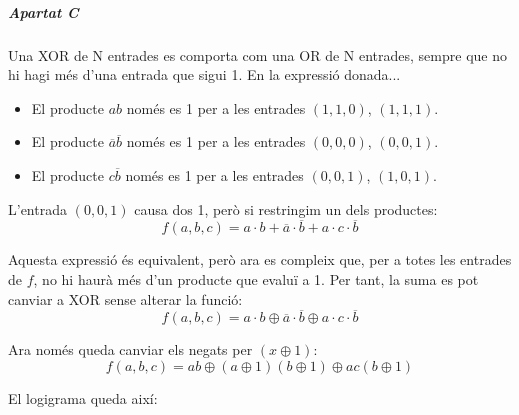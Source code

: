 \subparagraph{Apartat C}

Una \textsf{XOR} de N entrades es comporta com una \textsf{OR} de N entrades, sempre que no hi hagi més d'una entrada que sigui 1. En la expressió donada...

\begin{itemize}
\item El producte $ab$ només es 1 per a les entrades $\left(1,1,0\right)$, $\left(1,1,1\right)$.
\item El producte $\overline{a}\overline{b}$ només es 1 per a les entrades $\left(0,0,0\right)$, $\left(0,0,1\right)$.
\item El producte $c\overline{b}$ només es 1 per a les entrades $\left(0,0,1\right)$, $\left(1,0,1\right)$.
\end{itemize}

L'entrada $\left(0,0,1\right)$ causa dos 1, però si restringim un dels productes:
%
\begin{equation*}
  f(a,b,c) = a \cdot b + \overline{a} \cdot \overline{b} + a \cdot c \cdot \overline{b}
\end{equation*}

Aquesta expressió és equivalent, però ara es compleix que, per a totes les entrades de $f$, no hi haurà més d'un producte que evaluï a 1. Per tant, la suma es pot canviar a \textsf{XOR} sense alterar la funció:
%
\begin{equation*}
  f(a,b,c) = a \cdot b \oplus \overline{a} \cdot \overline{b} \oplus a \cdot c \cdot \overline{b}
\end{equation*}

Ara només queda canviar els negats per $\left(x \oplus 1\right)$:
%
\begin{equation*}
  f(a,b,c) = a b \oplus \left(a \oplus 1\right) \left(b \oplus 1\right) \oplus a c \left(b \oplus 1\right)
\end{equation*}

El logigrama queda així:


